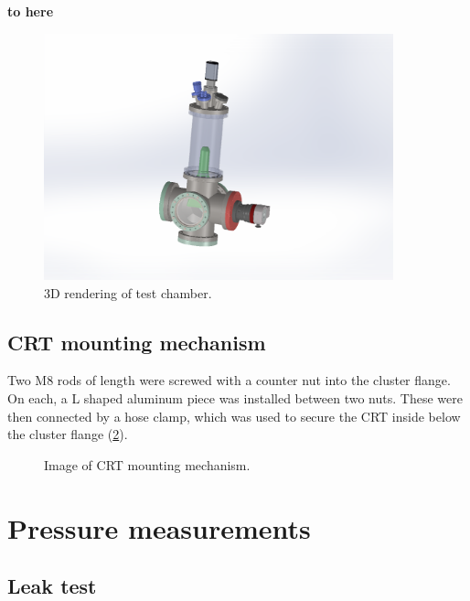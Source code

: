 \textbf{to here}
 
\begin{figure}[ht]
	\centering
 	
	\includegraphics[width=0.9\textwidth]{./Chapters/vacuum-chamber/test_chamber} %
	
	\caption{3D rendering of test chamber.}
	\label{fig:3D rendering of test chamber}
\end{figure}
 
\subsection{CRT mounting mechanism}
\label{subsec:CRT mounting mechanism}

Two M8 rods of length  were screwed with a counter nut into the cluster flange. On each, a L shaped aluminum piece was installed between two nuts. These were then connected by a hose clamp, which was used to secure the CRT inside below the cluster flange (\cref{fig:Image of CRT mounting mechanism}).
 

\begin{figure}[h]
	\centering
	
	
	\caption{Image of CRT mounting mechanism.}
	\label{fig:Image of CRT mounting mechanism}
\end{figure}


\section{Pressure measurements}
\subsection{Leak test} 
\label{sec:Measurement of outgassing}

